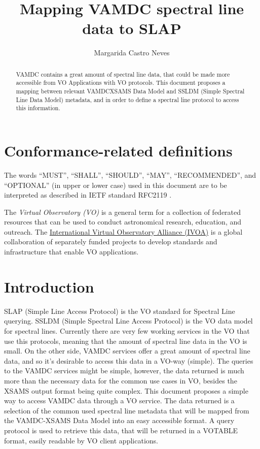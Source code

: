 \documentclass[11pt,a4paper]{ivoa}
\title{Mapping VAMDC spectral line data to SLAP}
\author{Margarida Castro Neves}
\begin{document}
\begin{abstract}
VAMDC contains  a great amount of spectral line data, that could be made more
accessible from VO Applications with VO protocols. This document proposes a mapping 
between relevant VAMDCXSAMS Data Model and SSLDM (Simple Spectral Line Data Model) metadata,
and in order to define a spectral line protocol to access this information.


\end{abstract}




\section*{Conformance-related definitions}

The words ``MUST'', ``SHALL'', ``SHOULD'', ``MAY'', ``RECOMMENDED'', and
``OPTIONAL'' (in upper or lower case) used in this document are to be
interpreted as described in IETF standard RFC2119 \citep{std:RFC2119}.

The \emph{Virtual Observatory (VO)} is a
general term for a collection of federated resources that can be used
to conduct astronomical research, education, and outreach.
The \href{http://www.ivoa.net}{International
Virtual Observatory Alliance (IVOA)} is a global
collaboration of separately funded projects to develop standards and
infrastructure that enable VO applications.


\section{Introduction}

SLAP (Simple Line Access Protocol) is the VO standard for Spectral Line querying. SSLDM (Simple Spectral Line Access Protocol) is the VO data model for spectral lines.
Currently there are very few working services in the VO that use this protocols, meaning that the amount of spectral line data in the VO is small. 
On the other side, VAMDC services offer a great amount of spectral line data, and  so it's desirable to access this data in a VO-way (simple). 
The queries to the VAMDC services might be simple, however, the data returned is much more than the necessary data for the common use cases in VO, besides the XSAMS \cite{XSAMS:Docs}output format being quite complex.
This document proposes a simple way to access VAMDC data through a VO service. The data returned is a selection of the common used spectral line metadata that will be mapped from the VAMDC-XSAMS Data Model \cite{XSAMS:ecosystem} into an easy accessible format. A query protocol is used  to retrieve this data,  that will be returned in a VOTABLE format, easily readable by VO client applications.
\end{document}
